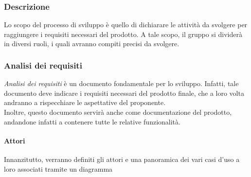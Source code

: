 \subsubsection{Descrizione}
Lo scopo del processo di sviluppo è quello di dichiarare le attività da svolgere per raggiungere i requisiti necessari del prodotto.
A tale scopo, il gruppo si dividerà in diversi ruoli, i quali avranno compiti precisi da svolgere.
\subsubsection{Analisi dei requisiti}
\textit{Analisi dei requisiti} è un documento fondamentale per lo sviluppo. Infatti, tale documento deve indicare i requisiti necessari del prodotto finale, che a loro volta andranno a rispecchiare le aspettative del proponente. \\
Inoltre, questo documento servirà anche come documentazione del prodotto, andandone infatti a contenere tutte le relative funzionalità.
\paragraph{Attori} 
Innanzitutto, verranno definiti gli attori e una panoramica dei vari casi d'uso a loro associati tramite un diagramma
